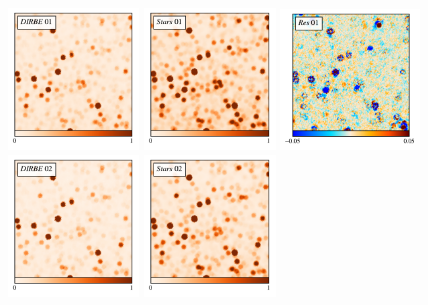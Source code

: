 \documentclass{aa}
\begin{document}
\begin{figure}
  \centering
  \includegraphics[width=0.31\textwidth]{figs/zoom/bandmap_01.pdf}
  \includegraphics[width=0.31\textwidth]{figs/zoom/starmap_01.pdf}
  \includegraphics[width=0.33\textwidth]{figs/zoom/resmap_01.pdf}\\
    \includegraphics[width=0.31\textwidth]{figs/zoom/bandmap_02.pdf}
  \includegraphics[width=0.31\textwidth]{figs/zoom/starmap_02.pdf}

\end{figure}
\end{document}
